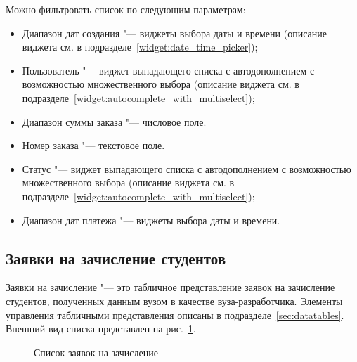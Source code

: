 Можно фильтровать список по следующим параметрам:
\begin{itemize}
	\item Диапазон дат создания "--- виджеты выбора даты и времени 
	(описание виджета см. в подразделе~\ref{widget:date_time_picker});
	\item Пользователь "--- виджет выпадающего списка с автодополнением с возможностью множественного выбора 
	(описание виджета см. в подразделе~\ref{widget:autocomplete_with_multiselect});
	\item Диапазон суммы заказа "--- числовое поле.
	\item Номер заказа "--- текстовое поле.
	\item Статус "--- виджет выпадающего списка с автодополнением с возможностью множественного выбора 
	(описание виджета см. в подразделе~\ref{widget:autocomplete_with_multiselect});
	\item Диапазон дат платежа "--- виджеты выбора даты и времени.
\end{itemize}


\subsection{Заявки на зачисление студентов}

Заявки на зачисление "--- это табличное представление заявок на зачисление студентов, 
полученных данным вузом в качестве вуза-разработчика. 
Элементы управления табличными представления описаны в подразделе~\ref{sec:datatables}.
Внешний вид списка представлен на рис.~\ref{img:agreement:enroll_req_list}. 

\begin{figure}[H]
	\caption{Список заявок на зачисление}
	\label{img:agreement:enroll_req_list}
\end{figure}

